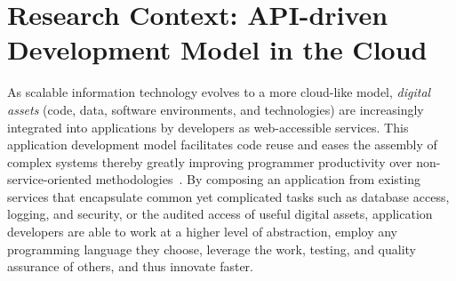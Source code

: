 \documentclass[10pt]{article}
\begin{document}
\section{Research Context: API-driven Development Model in the Cloud}
As scalable information technology evolves to a more cloud-like model,
{\em digital assets} (code, data, software environments, and technologies) 
are increasingly integrated into applications by developers 
as web-accessible services.
This application development model facilitates code reuse and eases the 
assembly of complex systems thereby greatly improving programmer productivity
over non-service-oriented methodologies~\cite{Dan:2008:SSR:1370916.1370923}. 
By composing an application from existing services that 
encapsulate common yet complicated tasks such as
database access, logging, and security, or the audited access of useful 
digital assets, application developers are able  
to work at a higher level of abstraction, employ any programming 
language they choose, leverage the work, testing, and quality
assurance of others, and thus innovate faster.  
\end{document}
